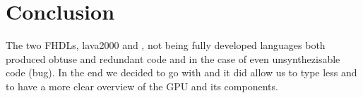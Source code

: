 \chapter{Conclusion} 

The two FHDLs, lava2000 and \clash, not being fully developed languages both
produced obtuse and redundant code and in the case of \clash even
unsynthezisable code (bug). In the end we decided to go with \clash and it did
allow us to type less and to have a more clear overview of the GPU and its
components.
